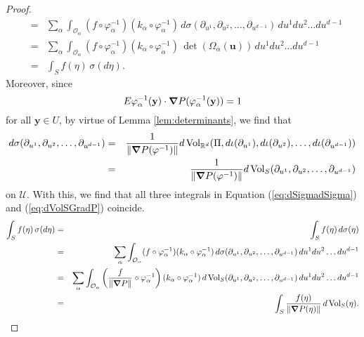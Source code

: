 \documentclass{article}
\renewcommand\det{\operatorname{det}}
\newcommand{\al}{\alpha}
\newcommand{\f}[2]{\frac{#1}{#2}}
\newcommand{\lp}{\left(}
\newcommand{\rp}{\right)}
\theoremstyle{theorem}
\newcommand{\Vol}{\operatorname{Vol}}
\begin{document}
\begin{proof}
\begin{eqnarray*}
    &=& \sum_\al \int_{\mathcal{O}_\al} (f\circ \varphi^{-1}_\al) (k_\al \circ \varphi^{-1}_\al)\, d\sigma(\partial_{u^1},\partial_{u^2},\dots,\partial_{u^{d-1}}) \, du^1 du^2 \dots du^{d-1} \\
    &=& \sum_\al \int_{\mathcal{O}_\al} (f\circ \varphi^{-1}_\al) (k_\al \circ \varphi^{-1}_\al)\, \det(\Omega_\al(\mathbf{u})) \, du^1 du^2 \dots du^{d-1} \\
    &=& \int_S f(\eta)\, \sigma(d\eta).
\end{eqnarray*}
Moreover, since 
\begin{equation*}
E\varphi_\al^{-1}(\mathbf{y})\cdot \grad P(\varphi_\al^{-1}(\mathbf{y}))=1
\end{equation*}
for all $\mathbf{y}\in U$, by virtue of Lemma \ref{lem:determinants}, we find that
\begin{eqnarray*}
d\sigma(\partial_{u^1},\partial_{u^2},\dots,\partial_{u^{d-1}})&=&\frac{1}{\norm{\grad P(\varphi^{-1}) }}d\Vol_{\mathbb{R}^d}(\Pi,d\iota(\partial_{u^1}),d\iota(\partial_{u^2}),\dots,d\iota(\partial_{u^{d-1}})) \\
&=&\frac{1}{\norm{\grad P(\varphi^{-1}) }}  d\Vol_S(\partial_{u^1},\partial_{u^2},\dots,\partial_{u^{d-1}})
\end{eqnarray*}
on $\mathcal{U}$. With this, we find that all three integrals in Equation (\ref{eq:dSigmadSigma}) and  (\ref{eq:dVolSGradP}) coincide. 
\begin{eqnarray*}
    \int_S f(\eta)\,\sigma(d\eta) &=&
    \int_S f(\eta)\,d\sigma(\eta)\\
    &=& \sum_\al \int_{\mathcal{O}_\al} (f\circ \varphi^{-1}_\al) (k_\al \circ \varphi^{-1}_\al)\, d\sigma(\partial_{u^1},\partial_{u^2},\dots,\partial_{u^{d-1}}) \, du^1 du^2 \dots du^{d-1} \\
    &=& \sum_\al \int_{\mathcal{O}_\al} \lp \f{f}{\norm{\grad P}}
    \circ \varphi^{-1}_\al \rp (k_\al \circ \varphi^{-1}_\al)\, d\Vol_S(\partial_{u^1},\partial_{u^2},\dots,\partial_{u^{d-1}}) \, du^1 du^2 \dots du^{d-1} \\
    &=& \int_S \f{f(\eta)}{\norm{\grad P(\eta)}} \, d\Vol_S(\eta).
\end{eqnarray*}


\end{proof}
\end{document}
